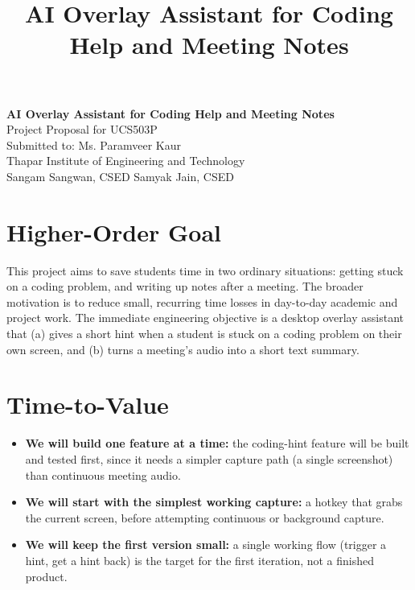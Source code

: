 \documentclass[11pt]{article}
\title{\textbf{AI Overlay Assistant for Coding Help and Meeting Notes}}
\author{}
\date{}
\begin{document}
\pagestyle{plain}
\thispagestyle{empty}

\begin{center}
{\LARGE \textbf{AI Overlay Assistant for Coding Help and Meeting Notes}}\\[6pt]
Project Proposal for UCS503P\\
Submitted to: Ms. Paramveer Kaur\\
Thapar Institute of Engineering and Technology\\[10pt]
Sangam Sangwan, CSED \quad Samyak Jain, CSED
\end{center}

\vspace{10pt}

\section{Higher-Order Goal}
This project aims to save students time in two ordinary situations: getting stuck on a
coding problem, and writing up notes after a meeting. The broader motivation is to reduce
small, recurring time losses in day-to-day academic and project work. The immediate
engineering objective is a desktop overlay assistant that (a) gives a short hint when a
student is stuck on a coding problem on their own screen, and (b) turns a meeting's audio
into a short text summary.

\section{Time-to-Value}
\begin{itemize}
  \item \textbf{We will build one feature at a time:} the coding-hint feature will be built
    and tested first, since it needs a simpler capture path (a single screenshot) than
    continuous meeting audio.
  \item \textbf{We will start with the simplest working capture:} a hotkey that grabs the
    current screen, before attempting continuous or background capture.
  \item \textbf{We will keep the first version small:} a single working flow (trigger a
    hint, get a hint back) is the target for the first iteration, not a finished product.
\end{itemize}
\end{document}
